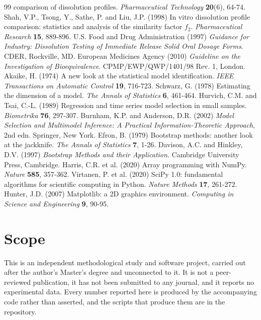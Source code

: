 \documentclass[11pt,a4paper]{article}
\begin{document}
\begin{thebibliography}{99}
comparison of dissolution profiles. \emph{Pharmaceutical Technology}
\textbf{20}(6), 64-74.
 Shah, V.P., Tsong, Y., Sathe, P. and Liu, J.P. (1998)
In vitro dissolution profile comparison: statistics and analysis of the
similarity factor $f_2$. \emph{Pharmaceutical Research} \textbf{15}, 889-896.
 U.S. Food and Drug Administration (1997)
\emph{Guidance for Industry: Dissolution Testing of Immediate Release Solid
Oral Dosage Forms}. CDER, Rockville, MD.
 European Medicines Agency (2010) \emph{Guideline on the
Investigation of Bioequivalence}. CPMP/EWP/QWP/1401/98 Rev. 1, London.
 Akaike, H. (1974) A new look at the statistical model
identification. \emph{IEEE Transactions on Automatic Control} \textbf{19},
716-723.
 Schwarz, G. (1978) Estimating the dimension of a model.
\emph{The Annals of Statistics} \textbf{6}, 461-464.
 Hurvich, C.M. and Tsai, C.-L. (1989) Regression and time
series model selection in small samples. \emph{Biometrika} \textbf{76},
297-307.
 Burnham, K.P. and Anderson, D.R. (2002) \emph{Model
Selection and Multimodel Inference: A Practical Information-Theoretic
Approach}, 2nd edn. Springer, New York.
 Efron, B. (1979) Bootstrap methods: another look at the
jackknife. \emph{The Annals of Statistics} \textbf{7}, 1-26.
 Davison, A.C. and Hinkley, D.V. (1997) \emph{Bootstrap
Methods and their Application}. Cambridge University Press, Cambridge.
 Harris, C.R. et al. (2020) Array programming with NumPy.
\emph{Nature} \textbf{585}, 357-362.
 Virtanen, P. et al. (2020) SciPy 1.0: fundamental
algorithms for scientific computing in Python. \emph{Nature Methods}
\textbf{17}, 261-272.
 Hunter, J.D. (2007) Matplotlib: a 2D graphics
environment. \emph{Computing in Science and Engineering} \textbf{9}, 90-95.
\end{thebibliography}

\section*{Scope}
\small
This is an independent methodological study and software project, carried out
after the author's Master's degree and unconnected to it. It is not a
peer-reviewed publication, it has not been submitted to any journal, and it
reports no experimental data. Every number reported here is produced by the
accompanying code rather than asserted, and the scripts that produce them are
in the repository.
\end{document}
